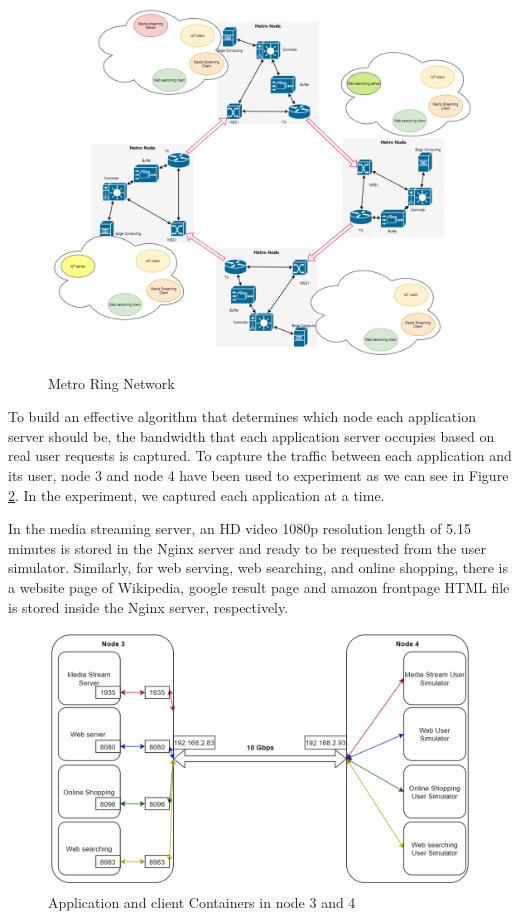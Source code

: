 \documentclass[conference]{IEEEtran}
\begin{document}
\begin{figure}[]
\centering
    \includegraphics[scale = 0.25]{imgs/real_experiment_set_up.png}
    \caption{Metro Ring Network}
    \label{fig:real_set_up}
\end{figure}

To build an effective algorithm that determines which node each application server should be, the bandwidth that each application server occupies based on real user requests is captured. To capture the traffic between each application and its user, node 3 and node 4 have been used to experiment as we can see in Figure \ref{fig:server_deployment}. In the experiment, we captured each application at a time.

In the media streaming server, an HD video 1080p resolution length of 5.15 minutes is stored in the Nginx server and ready to be requested from the user simulator. Similarly, for web serving, web searching, and online shopping, there is a website page of Wikipedia, google result page and amazon frontpage HTML file is stored inside the Nginx server, respectively.

\begin{figure}[]
    \centering
        \includegraphics[scale = 0.3]{imgs/server_deployment.png}
        \caption{Application and client Containers in node 3 and 4}
        \label{fig:server_deployment}
    \end{figure}
\end{document}
